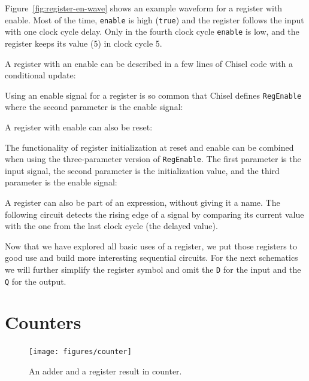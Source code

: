 \documentclass[%
    10pt,
    headinclude, footexclude,
    openright, %
    notitlepage,
    cleardoubleempty,
    headsepline,
    pointlessnumbers,
    bibtotoc, idxtotoc,
    ]{scrbook}
\newcommand{\code}[1]{{\lstinline[basicstyle=\small\ttfamily]{#1}}}
\begin{document}
Figure~\ref{fig:register-en-wave} shows an example waveform for a register
with enable. Most of the time, \code{enable} is high (\code{true}) and the register
follows the input with one clock cycle delay. Only in the fourth clock cycle
\code{enable} is low, and the register keeps its value (5) in clock cycle 5.

A register with an enable can be described in a few lines of Chisel code
with a conditional update:


\noindent Using an enable signal for a register is so common that Chisel defines
\code{RegEnable} where the second parameter is the enable signal:


\noindent A register with enable can also be reset:


\noindent The functionality of register initialization at reset and enable can be combined when
using the three-parameter version of \code{RegEnable}. The first parameter is the input signal,
the second parameter is the initialization value, and the third parameter is the enable signal:




A register can also be part of an expression, without giving it a name.
The following circuit detects the rising edge of a signal by comparing its current
value with the one from the last clock cycle (the delayed value).


Now that we have explored all basic uses of a register, we put those registers to
good use and build more interesting sequential circuits. For the next schematics we
will further simplify the register symbol and omit the \code{D} for the input and the
\code{Q} for the output.

\section{Counters}
\label{sec:counter}

\begin{figure}
  \centering
  \texttt{[image: figures/counter]}
  \caption{An adder and a register result in counter.}
  \label{fig:counter}
\end{figure}
\end{document}
